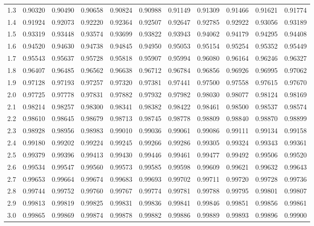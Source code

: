 \documentclass{article}
\begin{document}
\begin{center}
\begin{tabular}{*{11}{M{12.9mm}}}
1.3 & 0.90320 & 0.90490 & 0.90658 & 0.90824 & 0.90988 & 0.91149 & 0.91309 & 0.91466 & 0.91621 & 0.91774\\
1.4 & 0.91924 & 0.92073 & 0.92220 & 0.92364 & 0.92507 & 0.92647 & 0.92785 & 0.92922 & 0.93056 & 0.93189\\
1.5 & 0.93319 & 0.93448 & 0.93574 & 0.93699 & 0.93822 & 0.93943 & 0.94062 & 0.94179 & 0.94295 & 0.94408\\
1.6 & 0.94520 & 0.94630 & 0.94738 & 0.94845 & 0.94950 & 0.95053 & 0.95154 & 0.95254 & 0.95352 & 0.95449\\
1.7 & 0.95543 & 0.95637 & 0.95728 & 0.95818 & 0.95907 & 0.95994 & 0.96080 & 0.96164 & 0.96246 & 0.96327\\
1.8 & 0.96407 & 0.96485 & 0.96562 & 0.96638 & 0.96712 & 0.96784 & 0.96856 & 0.96926 & 0.96995 & 0.97062\\
1.9 & 0.97128 & 0.97193 & 0.97257 & 0.97320 & 0.97381 & 0.97441 & 0.97500 & 0.97558 & 0.97615 & 0.97670\\
2.0 & 0.97725 & 0.97778 & 0.97831 & 0.97882 & 0.97932 & 0.97982 & 0.98030 & 0.98077 & 0.98124 & 0.98169\\
2.1 & 0.98214 & 0.98257 & 0.98300 & 0.98341 & 0.98382 & 0.98422 & 0.98461 & 0.98500 & 0.98537 & 0.98574\\
2.2 & 0.98610 & 0.98645 & 0.98679 & 0.98713 & 0.98745 & 0.98778 & 0.98809 & 0.98840 & 0.98870 & 0.98899\\
2.3 & 0.98928 & 0.98956 & 0.98983 & 0.99010 & 0.99036 & 0.99061 & 0.99086 & 0.99111 & 0.99134 & 0.99158\\
2.4 & 0.99180 & 0.99202 & 0.99224 & 0.99245 & 0.99266 & 0.99286 & 0.99305 & 0.99324 & 0.99343 & 0.99361\\
2.5 & 0.99379 & 0.99396 & 0.99413 & 0.99430 & 0.99446 & 0.99461 & 0.99477 & 0.99492 & 0.99506 & 0.99520\\
2.6 & 0.99534 & 0.99547 & 0.99560 & 0.99573 & 0.99585 & 0.99598 & 0.99609 & 0.99621 & 0.99632 & 0.99643\\
2.7 & 0.99653 & 0.99664 & 0.99674 & 0.99683 & 0.99693 & 0.99702 & 0.99711 & 0.99720 & 0.99728 & 0.99736\\
2.8 & 0.99744 & 0.99752 & 0.99760 & 0.99767 & 0.99774 & 0.99781 & 0.99788 & 0.99795 & 0.99801 & 0.99807\\
2.9 & 0.99813 & 0.99819 & 0.99825 & 0.99831 & 0.99836 & 0.99841 & 0.99846 & 0.99851 & 0.99856 & 0.99861\\
3.0 & 0.99865 & 0.99869 & 0.99874 & 0.99878 & 0.99882 & 0.99886 & 0.99889 & 0.99893 & 0.99896 & 0.99900\\

\end{tabular}
\end{center}
\end{document}
